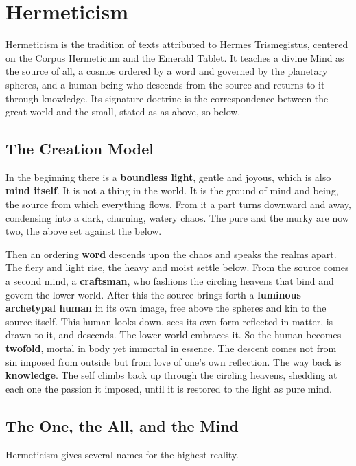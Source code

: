 \section{Hermeticism}

Hermeticism is the tradition of texts attributed to Hermes Trismegistus,
centered on the Corpus Hermeticum and the Emerald Tablet. It teaches a divine
Mind as the source of all, a cosmos ordered by a word and governed by the
planetary spheres, and a human being who descends from the source and returns to
it through knowledge. Its signature doctrine is the correspondence between the
great world and the small, stated as as above, so below.

\subsection{The Creation Model}

In the beginning there is a \textbf{boundless light}, gentle and joyous, which is also \textbf{mind itself}. It is not a thing in the world. It is the ground of mind and being, the source from which everything flows. From it a part turns downward and away, condensing into a dark, churning, watery chaos. The pure and the murky are now two, the above set against the below.

Then an ordering \textbf{word} descends upon the chaos and speaks the realms apart. The fiery and light rise, the heavy and moist settle below. From the source comes a second mind, a \textbf{craftsman}, who fashions the circling heavens that bind and govern the lower world. After this the source brings forth a \textbf{luminous archetypal human} in its own image, free above the spheres and kin to the source itself. This human looks down, sees its own form reflected in matter, is drawn to it, and descends. The lower world embraces it. So the human becomes \textbf{twofold}, mortal in body yet immortal in essence. The descent comes not from sin imposed from outside but from love of one's own reflection. The way back is \textbf{knowledge}. The self climbs back up through the circling heavens, shedding at each one the passion it imposed, until it is restored to the light as pure mind.

\subsection{The One, the All, and the Mind}

Hermeticism gives several names for the highest reality.

